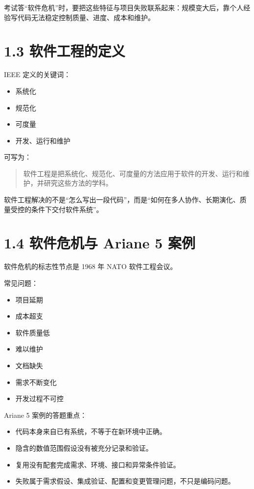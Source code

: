 \documentclass[UTF8,zihao=-4]{ctexart}
\begin{document}
考试答“软件危机”时，要把这些特征与项目失败联系起来：规模变大后，靠个人经验写代码无法稳定控制质量、进度、成本和维护。

\section{1.3 软件工程的定义}

IEEE 定义的关键词：

\begin{itemize}
\item 系统化
\item 规范化
\item 可度量
\item 开发、运行和维护
\end{itemize}

可写为：

\begin{quote}
软件工程是把系统化、规范化、可度量的方法应用于软件的开发、运行和维护，并研究这些方法的学科。
\end{quote}

软件工程解决的不是“怎么写出一段代码”，而是“如何在多人协作、长期演化、质量受控的条件下交付软件系统”。

\section{1.4 软件危机与 Ariane 5 案例}

软件危机的标志性节点是 1968 年 NATO 软件工程会议。

常见问题：

\begin{itemize}
\item 项目延期
\item 成本超支
\item 软件质量低
\item 难以维护
\item 文档缺失
\item 需求不断变化
\item 开发过程不可控
\end{itemize}

Ariane 5 案例的答题重点：

\begin{itemize}
\item 代码本身来自已有系统，不等于在新环境中正确。
\item 隐含的数值范围假设没有被充分记录和验证。
\item 复用没有配套完成需求、环境、接口和异常条件验证。
\item 失败属于需求假设、集成验证、配置和变更管理问题，不只是编码问题。
\end{itemize}
\end{document}
